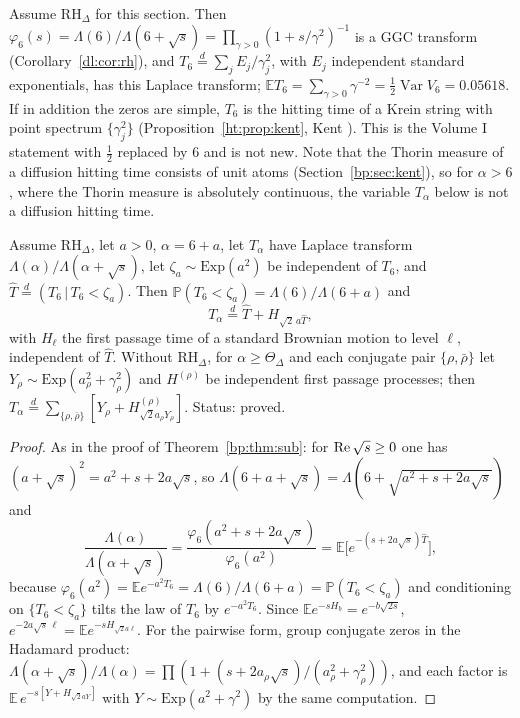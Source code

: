 Assume $\mathrm{RH}_\Delta$ for this section. Then $\varphi_6(s)=\Lambda(6)/\Lambda(6+\sqrt s)=\prod_{\gamma>0}(1+s/\gamma^2)^{-1}$ is a GGC transform (Corollary~\ref{dl:cor:rh}), and $T_6\overset d=\sum_jE_j/\gamma_j^2$, with $E_j$ independent standard exponentials, has this Laplace transform; $\mathbb ET_6=\sum_{\gamma>0}\gamma^{-2}=\frac12\operatorname{Var}V_6=0.05618$. If in addition the zeros are simple, $T_6$ is the hitting time of a Krein string with point spectrum $\{\gamma_j^2\}$ (Proposition~\ref{ht:prop:kent}, Kent \cite{Kent82}). This is the Volume I statement with $\frac12$ replaced by $6$ and is not new. Note that the Thorin measure of a diffusion hitting time consists of unit atoms (Section~\ref{bp:sec:kent}), so for $\alpha>6$, where the Thorin measure is absolutely continuous, the variable $T_\alpha$ below is not a diffusion hitting time.

\begin{proposition}\label{dl:prop:sub}
Assume $\mathrm{RH}_\Delta$, let $a>0$, $\alpha=6+a$, let $T_\alpha$ have Laplace transform $\Lambda(\alpha)/\Lambda(\alpha+\sqrt s)$, let $\zeta_a\sim\mathrm{Exp}(a^2)$ be independent of $T_6$, and $\widehat T\overset d=(T_6\,|\,T_6<\zeta_a)$. Then $\mathbb P(T_6<\zeta_a)=\Lambda(6)/\Lambda(6+a)$ and
\[
T_\alpha\overset d=\widehat T+H_{\sqrt2\,a\widehat T},
\]
with $H_\ell$ the first passage time of a standard Brownian motion to level $\ell$, independent of $\widehat T$. Without $\mathrm{RH}_\Delta$, for $\alpha\ge\Theta_\Delta$ and each conjugate pair $\{\rho,\bar\rho\}$ let $Y_\rho\sim\mathrm{Exp}(a_\rho^2+\gamma_\rho^2)$ and $H^{(\rho)}$ be independent first passage processes; then $T_\alpha\overset d=\sum_{\{\rho,\bar\rho\}}[Y_\rho+H^{(\rho)}_{\sqrt2a_\rho Y_\rho}]$. Status: proved.
\end{proposition}

\begin{proof}
As in the proof of Theorem~\ref{bp:thm:sub}: for $\operatorname{Re}\sqrt s\ge0$ one has $(a+\sqrt s)^2=a^2+s+2a\sqrt s$, so $\Lambda(6+a+\sqrt s)=\Lambda(6+\sqrt{a^2+s+2a\sqrt s})$ and
\[
\frac{\Lambda(\alpha)}{\Lambda(\alpha+\sqrt s)}=\frac{\varphi_6(a^2+s+2a\sqrt s)}{\varphi_6(a^2)}=\mathbb E\bigl[e^{-(s+2a\sqrt s)\widehat T}\bigr],
\]
because $\varphi_6(a^2)=\mathbb Ee^{-a^2T_6}=\Lambda(6)/\Lambda(6+a)=\mathbb P(T_6<\zeta_a)$ and conditioning on $\{T_6<\zeta_a\}$ tilts the law of $T_6$ by $e^{-a^2T_6}$. Since $\mathbb Ee^{-sH_b}=e^{-b\sqrt{2s}}$, $e^{-2a\sqrt s\,\ell}=\mathbb Ee^{-sH_{\sqrt2a\ell}}$. For the pairwise form, group conjugate zeros in the Hadamard product: $\Lambda(\alpha+\sqrt s)/\Lambda(\alpha)=\prod(1+(s+2a_\rho\sqrt s)/(a_\rho^2+\gamma_\rho^2))$, and each factor is $\mathbb E\,e^{-s[Y+H_{\sqrt2aY}]}$ with $Y\sim\mathrm{Exp}(a^2+\gamma^2)$ by the same computation.
\end{proof}

